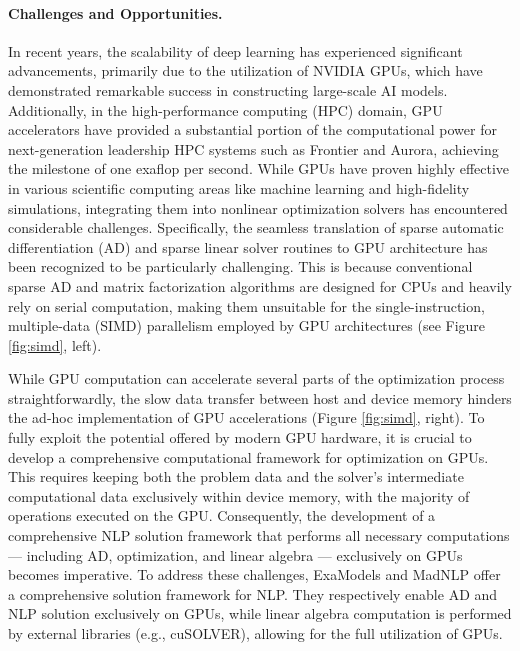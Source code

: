 \paragraph{Challenges and Opportunities.} In recent years, the
scalability of deep learning has experienced significant advancements,
primarily due to the utilization of NVIDIA
GPUs, which have demonstrated remarkable success in constructing
large-scale AI models. Additionally, in the high-performance computing (HPC) domain, GPU
accelerators have provided a substantial portion of the computational
power for next-generation leadership HPC systems such as Frontier and
Aurora, achieving the milestone of one exaflop per second.  While GPUs
have proven highly effective in various scientific computing areas
like machine learning and high-fidelity simulations, integrating them
into nonlinear optimization solvers has encountered
considerable challenges. Specifically, the seamless translation of
sparse automatic differentiation (AD) and sparse linear solver
routines to GPU architecture has been recognized to be particularly
challenging.  This is because conventional sparse AD and matrix
factorization algorithms are designed for CPUs and heavily rely on
serial computation, making them unsuitable for the single-instruction,
multiple-data (SIMD) parallelism employed by GPU architectures (see
Figure \ref{fig:simd}, left).

While GPU computation can accelerate several parts of the optimization
process straightforwardly, the slow data transfer between host and
device memory hinders the ad-hoc implementation of GPU accelerations
(Figure \ref{fig:simd}, right). To fully exploit the potential offered
by modern GPU hardware, it is crucial to develop a comprehensive
computational framework for optimization on GPUs. This requires
keeping both the problem data and the solver's intermediate computational
data exclusively within device memory, with the majority of
operations executed on the GPU. Consequently, the development of a
comprehensive NLP solution framework that performs
all necessary computations --- including AD, optimization, and linear
algebra --- exclusively on GPUs becomes imperative.  To address these
challenges, ExaModels and MadNLP offer a comprehensive solution
framework for NLP. They respectively enable AD and NLP solution
exclusively on GPUs, while linear algebra computation is performed by
external libraries (e.g., cuSOLVER), allowing for the full
utilization of GPUs.

